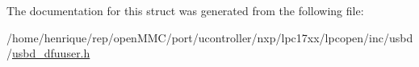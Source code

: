 The documentation for this struct was generated from the following file\-:\begin{DoxyCompactItemize}
\item 
/home/henrique/rep/open\-M\-M\-C/port/ucontroller/nxp/lpc17xx/lpcopen/inc/usbd/\hyperlink{usbd__dfuuser_8h}{usbd\-\_\-dfuuser.\-h}\end{DoxyCompactItemize}
